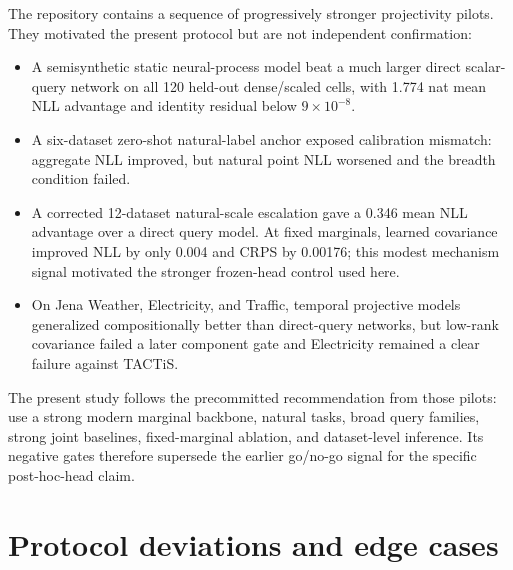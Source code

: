 The repository contains a sequence of progressively stronger projectivity
pilots.  They motivated the present protocol but are not independent
confirmation:
\begin{itemize}
  \item A semisynthetic static neural-process model beat a much larger direct
  scalar-query network on all 120 held-out dense/scaled cells, with 1.774 nat
  mean NLL advantage and identity residual below $9\times10^{-8}$.
  \item A six-dataset zero-shot natural-label anchor exposed calibration
  mismatch: aggregate NLL improved, but natural point NLL worsened and the
  breadth condition failed.
  \item A corrected 12-dataset natural-scale escalation gave a 0.346 mean NLL
  advantage over a direct query model.  At fixed marginals, learned covariance
  improved NLL by only 0.004 and CRPS by 0.00176; this modest mechanism signal
  motivated the stronger frozen-head control used here.
  \item On Jena Weather, Electricity, and Traffic, temporal projective models
  generalized compositionally better than direct-query networks, but
  low-rank covariance failed a later component gate and Electricity remained a
  clear failure against TACTiS.
\end{itemize}
The present study follows the precommitted recommendation from those pilots:
use a strong modern marginal backbone, natural tasks, broad query families,
strong joint baselines, fixed-marginal ablation, and dataset-level inference.
Its negative gates therefore supersede the earlier go/no-go signal for the
specific post-hoc-head claim.

\section{Protocol deviations and edge cases}\label{app:deviations}


